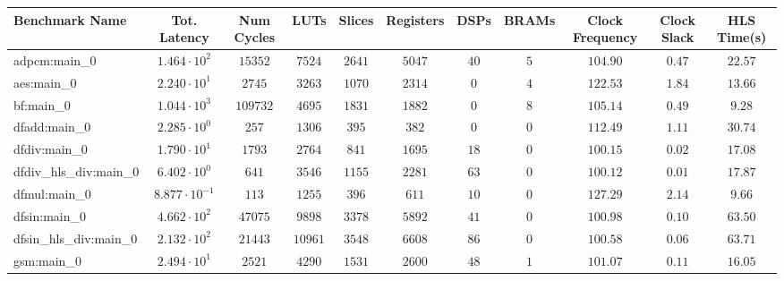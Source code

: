 \begin{tabular}{|l|c|c|c|c|c|c|c|c|c|c|}
\hline
Benchmark Name          & Tot. Latency            & Num Cycles & LUTs      & Slices    & Registers & DSPs    & BRAMs  & Clock Frequency & Clock Slack & HLS Time(s) \\
\hline
adpcm:main\_0           & $ 1.464 \cdot 10^{2}  $ & $ 15352  $ & $ 7524  $ & $ 2641  $ & $ 5047  $ & $ 40  $ & $ 5  $ & $ 104.90      $ & $ 0.47    $ & $ 22.57   $ \\
aes:main\_0             & $ 2.240 \cdot 10^{1}  $ & $ 2745   $ & $ 3263  $ & $ 1070  $ & $ 2314  $ & $ 0   $ & $ 4  $ & $ 122.53      $ & $ 1.84    $ & $ 13.66   $ \\
bf:main\_0              & $ 1.044 \cdot 10^{3}  $ & $ 109732 $ & $ 4695  $ & $ 1831  $ & $ 1882  $ & $ 0   $ & $ 8  $ & $ 105.14      $ & $ 0.49    $ & $ 9.28    $ \\
dfadd:main\_0           & $ 2.285 \cdot 10^{0}  $ & $ 257    $ & $ 1306  $ & $ 395   $ & $ 382   $ & $ 0   $ & $ 0  $ & $ 112.49      $ & $ 1.11    $ & $ 30.74   $ \\
dfdiv:main\_0           & $ 1.790 \cdot 10^{1}  $ & $ 1793   $ & $ 2764  $ & $ 841   $ & $ 1695  $ & $ 18  $ & $ 0  $ & $ 100.15      $ & $ 0.02    $ & $ 17.08   $ \\
dfdiv\_hls\_div:main\_0 & $ 6.402 \cdot 10^{0}  $ & $ 641    $ & $ 3546  $ & $ 1155  $ & $ 2281  $ & $ 63  $ & $ 0  $ & $ 100.12      $ & $ 0.01    $ & $ 17.87   $ \\
dfmul:main\_0           & $ 8.877 \cdot 10^{-1} $ & $ 113    $ & $ 1255  $ & $ 396   $ & $ 611   $ & $ 10  $ & $ 0  $ & $ 127.29      $ & $ 2.14    $ & $ 9.66    $ \\
dfsin:main\_0           & $ 4.662 \cdot 10^{2}  $ & $ 47075  $ & $ 9898  $ & $ 3378  $ & $ 5892  $ & $ 41  $ & $ 0  $ & $ 100.98      $ & $ 0.10    $ & $ 63.50   $ \\
dfsin\_hls\_div:main\_0 & $ 2.132 \cdot 10^{2}  $ & $ 21443  $ & $ 10961 $ & $ 3548  $ & $ 6608  $ & $ 86  $ & $ 0  $ & $ 100.58      $ & $ 0.06    $ & $ 63.71   $ \\
gsm:main\_0             & $ 2.494 \cdot 10^{1}  $ & $ 2521   $ & $ 4290  $ & $ 1531  $ & $ 2600  $ & $ 48  $ & $ 1  $ & $ 101.07      $ & $ 0.11    $ & $ 16.05   $ \\

\end{tabular}
